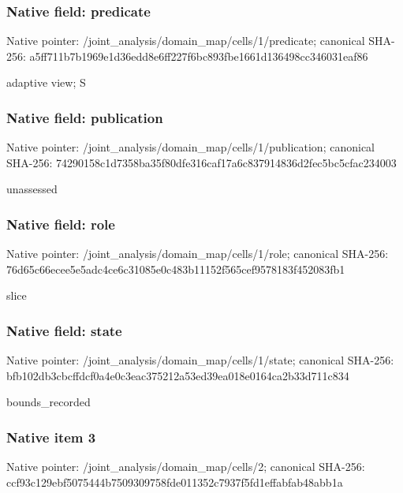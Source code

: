 \documentclass[10pt,a4paper]{article}
\begin{document}
\subsubsection{Native field: predicate}
Native pointer: /joint\_\allowbreak{}analysis/domain\_\allowbreak{}map/cells/1/predicate; canonical SHA-256: a5ff711b7b1969e1d36edd8e6ff227f6bc893fbe1661d136498cc346031eaf86

\begingroup\raggedright\sloppy adaptive view;\allowbreak{} S\par\endgroup

\subsubsection{Native field: publication}
Native pointer: /joint\_\allowbreak{}analysis/domain\_\allowbreak{}map/cells/1/publication; canonical SHA-256: 74290158c1d7358ba35f80dfe316caf17a6c837914836d2fec5bc5cfac234003

\begingroup\raggedright\sloppy unassessed\par\endgroup

\subsubsection{Native field: role}
Native pointer: /joint\_\allowbreak{}analysis/domain\_\allowbreak{}map/cells/1/role; canonical SHA-256: 76d65c66ecee5e5adc4ce6c31085e0c483b11152f565cef9578183f452083fb1

\begingroup\raggedright\sloppy slice\par\endgroup

\subsubsection{Native field: state}
Native pointer: /joint\_\allowbreak{}analysis/domain\_\allowbreak{}map/cells/1/state; canonical SHA-256: bfb102db3cbcffdcf0a4e0c3eac375212a53ed39ea018e0164ca2b33d711c834

\begingroup\raggedright\sloppy bounds\_\allowbreak{}recorded\par\endgroup

\subsubsection{Native item 3}
Native pointer: /joint\_\allowbreak{}analysis/domain\_\allowbreak{}map/cells/2; canonical SHA-256: ccf93c129ebf5075444b7509309758fde011352c7937f5fd1effabfab48abb1a
\end{document}

